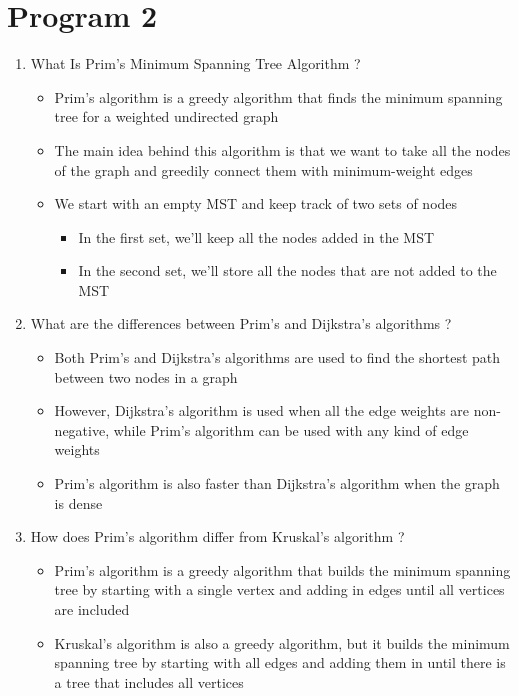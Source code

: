 ﻿\documentclass{article}
\begin{document}
	\section*{Program 2}  
	\begin{enumerate}[label=\arabic*. ]
		\item What Is Prim's Minimum Spanning Tree Algorithm ?
			\begin{itemize}
				\item Prim's algorithm is a greedy algorithm that finds the minimum spanning tree for a
					weighted undirected graph
				\item The main idea behind this algorithm is that we want to take all the nodes of the
					graph and greedily connect them with minimum-weight edges
				\item We start with an empty MST and keep track of two sets of nodes
				\begin{itemize}
					\item In the first set, we'll keep all the nodes added in the MST
					\item In the second set, we'll store all the nodes that are not added to the MST
				\end{itemize}
			\end{itemize}

		\item What are the differences between Prim's and Dijkstra's algorithms ?
			\begin{itemize}
				\item Both Prim's and Dijkstra's algorithms are used to find the shortest path between
					two nodes in a graph
				\item However, Dijkstra's algorithm is used when all the edge weights are non-negative,
					while Prim's algorithm can be used with any kind of edge weights
				\item Prim's algorithm is also faster than Dijkstra's algorithm when the graph is dense
			\end{itemize}

		\item How does Prim's algorithm differ from Kruskal's algorithm ?
			\begin{itemize}
				\item Prim's algorithm is a greedy algorithm that builds the minimum spanning tree by
					starting with a single vertex and adding in edges until all vertices are
					included
				\item Kruskal's algorithm is also a greedy algorithm, but it builds the minimum
					spanning tree by starting with all edges and adding them in until there is a
					tree that includes all vertices
			\end{itemize}
	\end{enumerate} \newpage
\end{document}
